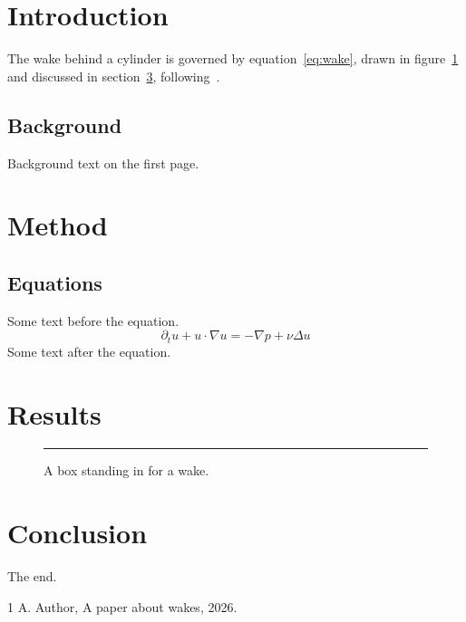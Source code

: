 \documentclass[a5paper]{article}
\begin{document}
\section{Introduction}
The wake behind a cylinder is governed by equation~\eqref{eq:wake}, drawn in
figure~\ref{fig:box} and discussed in section~\ref{sec:results},
following~\cite{ref}.
\subsection{Background}
Background text on the first page.
\newpage
\section{Method}
\subsection{Equations}
Some text before the equation.
\begin{equation}
  \partial_t u + u \cdot \nabla u = -\nabla p + \nu \Delta u
  \label{eq:wake}
\end{equation}
Some text after the equation.
\newpage
\section{Results}\label{sec:results}
\begin{figure}[h]
  \centering
  \rule{4cm}{2cm}
  \caption{A box standing in for a wake.}
  \label{fig:box}
\end{figure}
\newpage
\section{Conclusion}
The end.
\begin{thebibliography}{1}
 A. Author, A paper about wakes, 2026.
\end{thebibliography}
\end{document}
